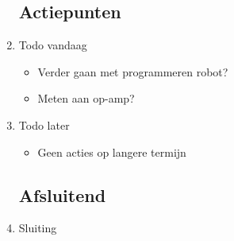 \documentclass{article}
\begin{document}
\begin{enumerate}
	\subsection*{Actiepunten}
	\item Todo vandaag
	\begin{itemize}
		\item Verder gaan met programmeren robot?
		\item Meten aan op-amp?
	\end{itemize}
	\item Todo later
	\begin{itemize}
		\item Geen acties op langere termijn
	\end{itemize}

	\noindent 
	\subsection*{Afsluitend}
	\item Sluiting %

\end{enumerate}
\end{document}

